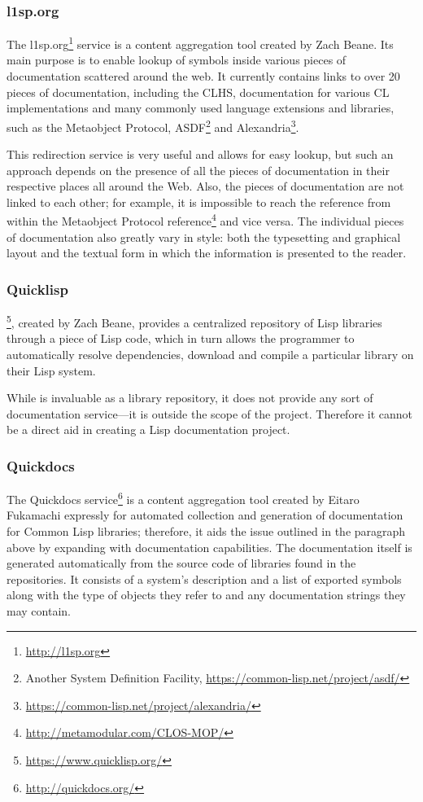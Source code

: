 \subsubsection{l1sp.org}

The l1sp.org\footnote{\url{http://l1sp.org}} service is a content aggregation tool created by Zach Beane. Its main purpose is to enable lookup of symbols inside various pieces of documentation scattered around the web. It currently contains links to over 20 pieces of documentation, including the CLHS, documentation for various CL implementations and many commonly used language extensions and libraries, such as the Metaobject Protocol, ASDF\footnote{Another System Definition Facility, \url{https://common-lisp.net/project/asdf/}} and Alexandria\footnote{\url{https://common-lisp.net/project/alexandria/}}.

This redirection service is very useful and allows for easy lookup, but such an approach depends on the presence of all the pieces of documentation in their respective places all around the Web. Also, the pieces of documentation are not linked to each other; for example, it is impossible to reach the \cl{} reference from within the Metaobject Protocol reference\footnote{\url{http://metamodular.com/CLOS-MOP/}} and vice versa. The individual pieces of documentation also greatly vary in style: both the typesetting and graphical layout and the textual form in which the information is presented to the reader.

\subsubsection{Quicklisp}

\ql{}\footnote{\url{https://www.quicklisp.org/}}, created by Zach Beane, provides a centralized repository of Lisp libraries through a piece of Lisp code, which in turn allows the programmer to automatically resolve dependencies, download and compile a particular library on their Lisp system.

While \ql{} is invaluable as a library repository, it does not provide any sort of documentation service---it is outside the scope of the \ql{} project. Therefore it cannot be a direct aid in creating a Lisp documentation project.

\subsubsection{Quickdocs}

The Quickdocs service\footnote{\url{http://quickdocs.org/}} is a content aggregation tool created by Eitaro Fukamachi expressly for automated collection and generation of documentation for Common Lisp libraries; therefore, it aids the issue outlined in the paragraph above by expanding \ql{} with documentation capabilities. The documentation itself is generated automatically from the source code of libraries found in the \ql{} repositories. It consists of a system's \ql{} description and a list of exported symbols along with the type of objects they refer to and any documentation strings they may contain.

